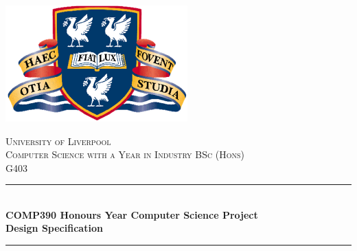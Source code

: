 \documentclass[12pt,a4paper,oneside]{report}
\begin{document}

\begin{titlepage}

\newcommand{\HRule}{\rule{\linewidth}{0.5mm}} %

\center %
 

\includegraphics[width=7cm]{images/uol.png}


\textsc{\LARGE University of Liverpool}\\[1.5cm] %
\textsc{\large Computer Science with a Year in Industry BSc (Hons)}\\[0.5cm] %
\textsc{\large G403}\\[0.5cm] %


\HRule \\[0.4cm]
{ \huge \bfseries COMP390 Honours Year Computer Science Project \\[0.5cm]
Design Specification}\\
[0.4cm] %
\HRule \\[1.5cm]
 


\end{titlepage}
\end{document}

